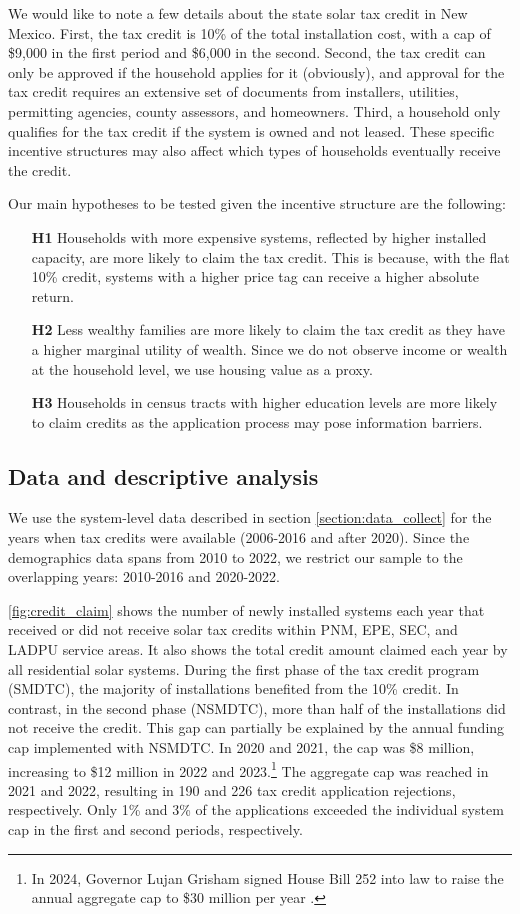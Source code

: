 \documentclass[12pt,twoside,letterpaper]{article}
\begin{document}
We would like to note a few details about the state solar tax credit in New Mexico. First, the tax credit is 10\% of the total installation cost, with a cap of \$9,000 in the first period and \$6,000 in the second. Second, the tax credit can only be approved if the household applies for it (obviously), and approval for the tax credit requires an extensive set of documents from installers, utilities, permitting agencies, county assessors, and homeowners. Third, a household only qualifies for the tax credit if the system is owned and not leased. These specific incentive structures may also affect which types of households eventually receive the credit.

Our main hypotheses to be tested given the incentive structure are the following:
\begin{itemize}
    \item[\textbf{H1}] Households with more expensive systems, reflected by higher installed capacity, are more likely to claim the tax credit. This is because, with the flat 10\% credit, systems with a higher price tag can receive a higher absolute return.
    \item[\textbf{H2}] Less wealthy families are more likely to claim the tax credit as they have a higher marginal utility of wealth. Since we do not observe income or wealth at the household level, we use housing value as a proxy.
    \item[\textbf{H3}] Households in census tracts with higher education levels are more likely to claim credits as the application process may pose information barriers.
\end{itemize}

\subsection{Data and descriptive analysis}

We use the system-level data described in section \ref{section:data_collect} for the years when tax credits were available (2006-2016 and after 2020). Since the demographics data spans from 2010 to 2022, we restrict our sample to the overlapping years: 2010-2016 and 2020-2022. 

\autoref{fig:credit_claim} shows the number of newly installed systems each year that received or did not receive solar tax credits within PNM, EPE, SEC, and LADPU service areas. It also shows the total credit amount claimed each year by all residential solar systems. During the first phase of the tax credit program (SMDTC), the majority of installations benefited from the 10\% credit. In contrast, in the second phase (NSMDTC), more than half of the installations did not receive the credit. This gap can partially be explained by the annual funding cap implemented with NSMDTC. In 2020 and 2021, the cap was \$8 million, increasing to \$12 million in 2022 and 2023.\footnote{In 2024, Governor Lujan Grisham signed House Bill 252 into law to raise the annual aggregate cap to \$30 million per year \parencite{newsolarcap}.} The aggregate cap was reached in 2021 and 2022, resulting in 190 and 226 tax credit application rejections, respectively. Only 1\% and 3\% of the applications exceeded the individual system cap in the first and second periods, respectively.
\end{document}

